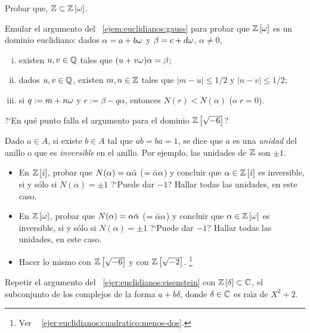 \begin{ejerEuclidianos}
\begin{enumerate}[(i)]
			Probar que, $\mathbb{Z}\subset{\ensuremath{\mathbb{Z}}}\left[\omega\right]$.
	\end{enumerate}
	Emular el argumento del \ejemname~\ref{ejem:euclidianos:gauss} para
	probar que ${\mathbb{Z}}\left[\omega\right]$ es un dominio euclidiano: dados
	$\alpha=a+b\omega$ y $\beta=c+d\omega$, $\alpha\neq 0$,
	\begin{enumerate}[(i)]
		\item\label{item:ejer:euclidianos:eisenstein:i}
			existen $u,v\in\mathbb{Q}$ tales que
			$(u+v\omega)\alpha=\beta$;
		\item\label{item:ejer:euclidianos:eisenstein:ii}
			dados $u,v\in\mathbb{Q}$, existen $m,n\in\mathbb{Z}$
			tales que $|m-u|\leq 1/2$ y $|n-v|\leq 1/2$;
		\item\label{item:ejer:euclidianos:eisenstein:iii}
			si $q:=m+n\omega$ y $r:=\beta-q\alpha$, entonces
			$N(r)<N(\alpha)$ (o $r=0$).
	\end{enumerate}
	?`En qu\'e punto falla el argumento para el dominio
	${\mathbb{Z}}\left[\sqrt{-6}\right]$?
\end{ejerEuclidianos}

\begin{ejerEuclidianos}\label{ejer:euclidianos:unidades}
	Dado $a\in A$, si existe $b\in A$ tal que $ab=ba=1$, se dice que
	$a$ es una \emph{unidad} del anillo o que es \emph{inversible} en el
	anillo. Por ejemplo, las unidades de $\mathbb{Z}$ son $\pm 1$.
	\begin{itemize}
		\item En ${\mathbb{Z}}\left[\mathit i\right]$, probar que
			$N(\alpha)=\alpha\bar{\alpha}$ ($=\bar{\alpha}\alpha$) y
			concluir que $\alpha\in{\ensuremath{\mathbb{Z}}}\left[\mathit i\right]$ es inversible,
			si y s\'olo si $N(\alpha)=\pm 1$ ?`Puede dar $-1$?
			Hallar todas las unidades, en este caso.
		\item En ${\mathbb{Z}}\left[\omega\right]$, probar que
			$N(\alpha)=\alpha\bar{\alpha}$ ($=\bar{\alpha}\alpha$) y
			concluir que $\alpha\in{\ensuremath{\mathbb{Z}}}\left[\omega\right]$ es
			inversible, si y s\'olo si $N(\alpha)=\pm 1$ ?`Puede
			dar $-1$? Hallar todas las unidades, en este caso.
		\item Hacer lo mismo con ${\mathbb{Z}}\left[\sqrt{-6}\right]$
			y con ${\mathbb{Z}}\left[\sqrt{-2}\right]$.%
			\footnote{
				Ver \ejername~%
				\ref{ejer:euclidianos:cuadratico:menos-dos}.
			}
	\end{itemize}
\end{ejerEuclidianos}

\begin{ejerEuclidianos}\label{ejer:euclidianos:cuadratico:menos-dos}
	Repetir el argumento del \ejername~\ref{ejer:euclidianos:eisenstein}
	con ${\mathbb{Z}}\left[\delta\right]\subset\mathbb{C}$, el subconjunto
	de los complejos de la forma $a+b\delta$, donde $\delta\in\mathbb{C}$
	es ra\'{\i}z de $X^2+2$.
\end{ejerEuclidianos}

